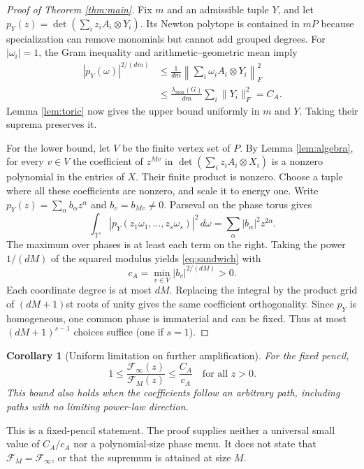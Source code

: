 \documentclass[11pt]{article}
\newtheorem{corollary}[theorem]{Corollary}
\newcommand{\F}{\mathcal F}
\begin{document}
\begin{proof}[Proof of Theorem \ref{thm:main}]
Fix $m$ and an admissible tuple $Y$, and let
$p_Y(z)=\det(\sum_i z_iA_i\otimes Y_i)$. Its Newton polytope is contained in $mP$ because specialization can remove monomials but cannot add grouped degrees. For $|\omega_i|=1$, the Gram inequality and arithmetic--geometric mean imply
\begin{align}
 |p_Y(\omega)|^{2/(dm)}
 &\le \frac{1}{dm}\left\|\sum_i\omega_i A_i\otimes Y_i\right\|_F^2\\
 &\le\frac{\lambda_{\max}(G)}{dm}\sum_i\|Y_i\|_F^2=C_A.
\end{align}
Lemma \ref{lem:toric} now gives the upper bound uniformly in $m$ and $Y$. Taking their suprema preserves it.

For the lower bound, let $V$ be the finite vertex set of $P$. By Lemma \ref{lem:algebra}, for every $v\in V$ the coefficient of $z^{Mv}$ in
$\det(\sum_i z_iA_i\otimes X_i)$ is a nonzero polynomial in the entries of $X$. Their finite product is nonzero. Choose a tuple where all these coefficients are nonzero, and scale it to energy one. Write
$p_Y(z)=\sum_\alpha b_\alpha z^\alpha$ and $b_v=b_{Mv}\ne0$. Parseval on the phase torus gives
\begin{equation}
 \int_{\mathbb T^s}|p_Y(z_1\omega_1,\ldots,z_s\omega_s)|^2\,d\omega
   =\sum_\alpha |b_\alpha|^2z^{2\alpha}.\label{eq:parseval}
\end{equation}
The maximum over phases is at least each term on the right. Taking the power $1/(dM)$ of the squared modulus yields \eqref{eq:sandwich} with
\[
 c_A=\min_{v\in V}|b_v|^{2/(dM)}>0.
\]
Each coordinate degree is at most $dM$. Replacing the integral by the product grid of $(dM+1)$st roots of unity gives the same coefficient orthogonality. Since $p_Y$ is homogeneous, one common phase is immaterial and can be fixed. Thus at most $(dM+1)^{s-1}$ choices suffice (one if $s=1$).
\end{proof}

\begin{corollary}[Uniform limitation on further amplification]
For the fixed pencil,
\[
 1\le\frac{\F_\infty(z)}{\F_M(z)}\le\frac{C_A}{c_A}
 \quad\text{for all }z>0.
\]
This bound also holds when the coefficients follow an arbitrary path, including paths with no limiting power-law direction.
\end{corollary}
This is a fixed-pencil statement. The proof supplies neither a universal small value of $C_A/c_A$ nor a polynomial-size phase menu. It does not state that $\F_M=\F_\infty$, or that the supremum is attained at size $M$.
\end{document}
